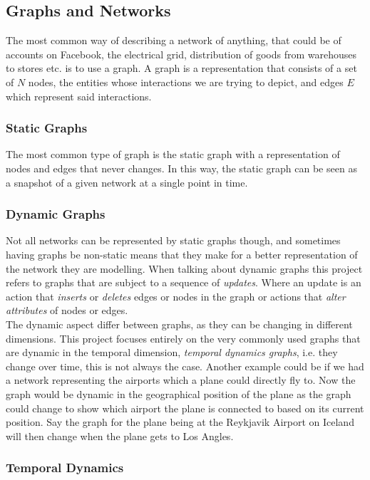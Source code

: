 \subsection{Graphs and Networks}
\label{sec:Method:Graphs}
The most common way of describing a network of anything, that could be of accounts on Facebook, the electrical grid, distribution of goods from warehouses to stores etc. is to use a graph.
A graph is a representation that consists of a set of $N$ nodes, the entities whose interactions we are trying to depict, and edges $E$ which represent said interactions.

\subsubsection{Static Graphs}
\label{sec:Method:Graphs:StaticGraphs}
The most common type of graph is the static graph with a representation of nodes and edges that never changes. 
In this way, the static graph can be seen as a snapshot of a given network at a single point in time.


\subsubsection{Dynamic Graphs}
\label{sec:Method:Graphs:DynamicGraphs}
Not all networks can be represented by static graphs though, and sometimes having graphs be non-static means that they make for a better representation of the network they are modelling. When talking about dynamic graphs this project refers to graphs that are subject to a sequence of \textit{updates}. Where an update is an action that \textit{inserts} or \textit{deletes} edges or nodes in the graph or actions that \textit{alter attributes} of nodes or edges.
\\
The dynamic aspect differ between graphs, as they can be changing in different dimensions. This project focuses entirely on the very commonly used graphs that are dynamic in the temporal dimension, \textit{temporal dynamics graphs}, i.e. they change over time, this is not always the case. Another example could be if we had a network representing the airports which a plane could directly fly to. Now the graph would be dynamic in the geographical position of the plane as the graph could change to show which airport the plane is connected to based on its current position. Say the graph for the plane being at the Reykjavik Airport on Iceland will then change when the plane gets to Los Angles.

\subsubsection{Temporal Dynamics}
\label{sec:Method:Graphs:TemporallyDynamicGraphs}











